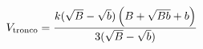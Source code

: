\documentclass[preview]{standalone}
\begin{document}
\begin{align*}
\special{dvisvgm:raw <g id='unique000'>}V_{\text{tronco}} \special{dvisvgm:raw </g>}\special{dvisvgm:raw <g id='unique001'>}= \special{dvisvgm:raw </g>}\special{dvisvgm:raw <g id='unique002'>}\frac{k(\sqrt{B}-\sqrt{b})\left(B+\sqrt{Bb}+b\right)}{3(\sqrt{B}-\sqrt{b})}\special{dvisvgm:raw </g>}
\end{align*}
\end{document}
